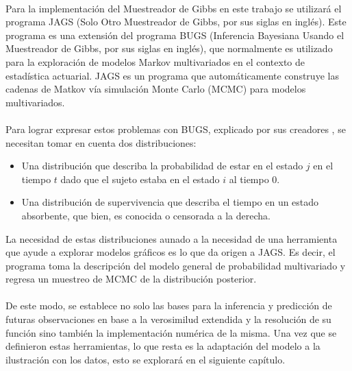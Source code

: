 \\
Para la implementaci\'on del Muestreador de Gibbs en este trabajo se utilizar\'a el programa JAGS (Solo Otro Muestreador de Gibbs, por sus siglas en ingl\'es). Este programa es una extensi\'on del programa BUGS (Inferencia Bayesiana Usando el Muestreador de Gibbs, por sus siglas en ingl\'es), que normalmente es utilizado para la exploraci\'on de modelos Markov multivariados en el contexto de estad\'istica actuarial. JAGS es un programa que autom\'aticamente construye las cadenas de Matkov v\'ia simulaci\'on Monte Carlo (MCMC) para modelos multivariados.\\
\\
Para lograr expresar estos problemas con BUGS, explicado por sus creadores \cite{plummer2003jags}, se necesitan tomar en cuenta dos distribuciones:
\begin{itemize}
\item Una distribuci\'on que describa la probabilidad de estar en el estado $j$ en el tiempo $t$ dado que el sujeto estaba en el estado $i$ al tiempo $0$.
\item Una distribuci\'on de supervivencia que describa el tiempo en un estado absorbente, que bien, es conocida o censorada a la derecha.
\end{itemize}
La necesidad de estas distribuciones aunado a la necesidad de una herramienta que ayude a explorar modelos gr\'aficos es lo que da origen a JAGS. Es decir, el programa toma la descripci\'on del modelo general de probabilidad multivariado y regresa un muestreo de MCMC de la distribuci\'on posterior.\\
\\
De este modo, se establece no solo las bases para la inferencia y predicci\'on de futuras observaciones en base a la verosimilud extendida y la resoluci\'on de su funci\'on sino tambi\'en la implementaci\'on num\'erica de la misma. Una vez que se definieron estas herramientas, lo que resta es la adaptaci\'on del modelo a la ilustraci\'on con los datos, esto se explorar\'a en el siguiente cap\'itulo.  